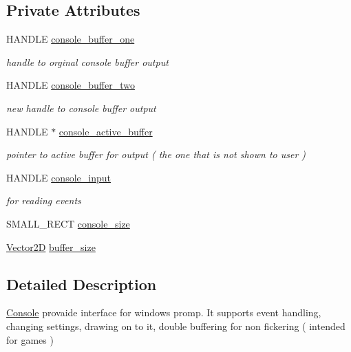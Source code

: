 \subsection*{Private Attributes}
\begin{DoxyCompactItemize}
\item 
H\+A\+N\+D\+LE \mbox{\hyperlink{classsc_1_1_console_a1a85530e67e217a1ceb3072efde5fed0}{console\+\_\+buffer\+\_\+one}}
\begin{DoxyCompactList}\small\item\em handle to orginal console buffer output \end{DoxyCompactList}\item 
H\+A\+N\+D\+LE \mbox{\hyperlink{classsc_1_1_console_a5a50d3e73c633a396e88d370cd782307}{console\+\_\+buffer\+\_\+two}}
\begin{DoxyCompactList}\small\item\em new handle to console buffer output \end{DoxyCompactList}\item 
H\+A\+N\+D\+LE $\ast$ \mbox{\hyperlink{classsc_1_1_console_a26bea53c8596a7080128601b0780e92b}{console\+\_\+active\+\_\+buffer}}
\begin{DoxyCompactList}\small\item\em pointer to active buffer for output ( the one that is not shown to user ) \end{DoxyCompactList}\item 
H\+A\+N\+D\+LE \mbox{\hyperlink{classsc_1_1_console_a9c6f9aa5d224b74bdae42a3ca591c85c}{console\+\_\+input}}
\begin{DoxyCompactList}\small\item\em for reading events \end{DoxyCompactList}\item 
S\+M\+A\+L\+L\+\_\+\+R\+E\+CT \mbox{\hyperlink{classsc_1_1_console_a7f4711856c9f7c63be59021127f68080}{console\+\_\+size}}
\item 
\mbox{\hyperlink{classsc_1_1_vector2_d}{Vector2D}} \mbox{\hyperlink{classsc_1_1_console_ad132f779812461e188adbd885318af3e}{buffer\+\_\+size}}
\end{DoxyCompactItemize}


\subsection{Detailed Description}
\mbox{\hyperlink{classsc_1_1_console}{Console}} provaide interface for windows promp. It supports event handling, changing settings, drawing on to it, double buffering for non fickering ( intended for games ) 

